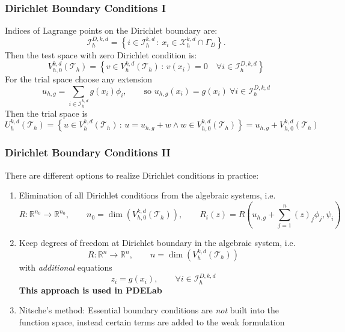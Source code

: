 \documentclass[aspectratio=169,11pt]{beamer}
\theoremstyle{definition}
\begin{document}
\begin{frame}
\frametitle{Dirichlet Boundary Conditions I}
Indices of Lagrange points on the Dirichlet boundary are:
\begin{equation*}
\mathcal{I}_h^{D,k,d} =
\left\{ i\in\mathcal{I}_h^{k,d}  \,:\,
x_i\in\mathcal{X}_h^{k,d} \cap\Gamma_D
\right\} .
\end{equation*}
Then the test space with zero Dirichlet condition is:
\begin{equation*}
V_{h,0}^{k,d}(\mathcal{T}_{h}) = \left\{
v\in V_{h}^{k,d}(\mathcal{T}_{h}) \,:\, v(x_i) = 0
\quad \forall i\in\mathcal{I}_h^{D,k,d}
 \right\}
\end{equation*}
For the trial space choose any extension
\begin{equation*}
u_{h,g} = \sum_{i\in \mathcal{I}_h^{k,d}}
g(x_i) \phi_i, \qquad \text{so $u_{h,g}(x_i)=g(x_i) \ \forall i\in\mathcal{I}_h^{D,k,d}$}
\end{equation*}
Then the trial space is
\begin{equation*}
U_{h}^{k,d}(\mathcal{T}_{h}) = \left\{ u\in V_h^{k,d}(\mathcal{T}_h)
\,:\, u = u_{h,g} + w \wedge w\in V_{h,0}^{k,d}(\mathcal{T}_{h})\right\} = u_{h,g} + V_{h,0}^{k,d}(\mathcal{T}_{h})
\end{equation*}
\end{frame}

\begin{frame}
\frametitle{Dirichlet Boundary Conditions II}
There are different options to realize Dirichlet conditions in practice:
\begin{enumerate}
\item Elimination of all Dirichlet conditions from the algebraic systems, i.e.
\begin{equation*}
R: \mathbb{R}^{n_0} \to \mathbb{R}^{n_0}, \qquad 
n_0 = \dim\left( V_{h,0}^{k,d}(\mathcal{T}_{h}) \right), \qquad
R_i(z) = R\left(u_{h,g} +\sum_{j=1}^n (z)_j\phi_j,\psi_i\right)
\end{equation*}
\item Keep degrees of freedom at Dirichlet boundary in the algebraic system, i.e.
\begin{equation*}
R: \mathbb{R}^n \to \mathbb{R}^n, \qquad n = \dim\left( V_{h}^{k,d}(\mathcal{T}_{h}) \right)
\end{equation*}
with \textit{additional} equations
\begin{equation*}
z_i = g(x_i), \qquad \forall i\in\mathcal{I}_h^{D,k,d}
\end{equation*}
\textbf{This approach is used in PDELab}
\item Nitsche's method: Essential boundary conditions are \textit{not} built into the function space, instead certain terms are added to
the weak formulation
\end{enumerate}
\end{frame}
\end{document}
